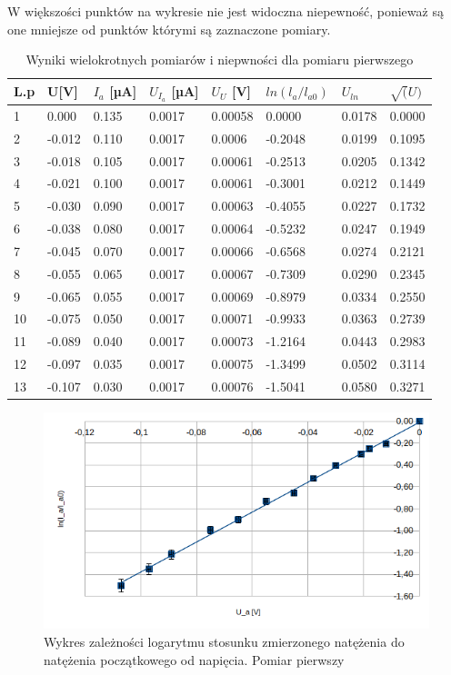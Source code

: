 \documentclass[a4paper]{article}
\begin{document}
W większości punktów na wykresie nie jest widoczna niepewność, ponieważ są one mniejsze od punktów którymi są zaznaczone pomiary.


\begin{table}[h!]
\centering
 \begin{tabular}{ | l | l | l | l | l | l | l | l | }
 \hline
L.p & U[V] & $I_{a}$ [µA] & $U_{I_{a}}$ [µA] & $U_{U}$ [V] & $ln(l_{a}/l_{a0})$ & $U_{ln}$ & $\sqrt(U)$ \\ \hline
1 & 0.000 & 0.135 & 0.0017 & 0.00058 & 0.0000 & 0.0178 & 0.0000 \\ \hline
2 & -0.012 & 0.110 & 0.0017 & 0.0006 & -0.2048 & 0.0199 & 0.1095 \\ \hline
3 & -0.018 & 0.105 & 0.0017 & 0.00061 & -0.2513 & 0.0205 & 0.1342 \\ \hline
4 & -0.021 & 0.100 & 0.0017 & 0.00061 & -0.3001 & 0.0212 & 0.1449 \\ \hline
5 & -0.030 & 0.090 & 0.0017 & 0.00063 & -0.4055 & 0.0227 & 0.1732 \\ \hline
6 & -0.038 & 0.080 & 0.0017 & 0.00064 & -0.5232 & 0.0247 & 0.1949 \\ \hline
7 & -0.045 & 0.070 & 0.0017 & 0.00066 & -0.6568 & 0.0274 & 0.2121 \\ \hline
8 & -0.055 & 0.065 & 0.0017 & 0.00067 & -0.7309 & 0.0290 & 0.2345 \\ \hline
9 & -0.065 & 0.055 & 0.0017 & 0.00069 & -0.8979 & 0.0334 & 0.2550 \\ \hline
10 & -0.075 & 0.050 & 0.0017 & 0.00071 & -0.9933 & 0.0363 & 0.2739 \\ \hline
11 & -0.089 & 0.040 & 0.0017 & 0.00073 & -1.2164 & 0.0443 & 0.2983 \\ \hline
12 & -0.097 & 0.035 & 0.0017 & 0.00075 & -1.3499 & 0.0502 & 0.3114 \\ \hline
13 & -0.107 & 0.030 & 0.0017 & 0.00076 & -1.5041 & 0.0580 & 0.3271 \\ \hline
 \end{tabular}
\caption{Wyniki wielokrotnych pomiarów i niepwności dla pomiaru pierwszego}
\label{pomiary-1}
\end{table}


\begin{figure}[h!]
	\includegraphics[scale=1]{T1_ln_U}
	\centering
	\caption{Wykres zależności logarytmu stosunku zmierzonego natężenia do natężenia początkowego od napięcia. Pomiar pierwszy}
	\label{fig-1}
\end{figure}
\end{document}

